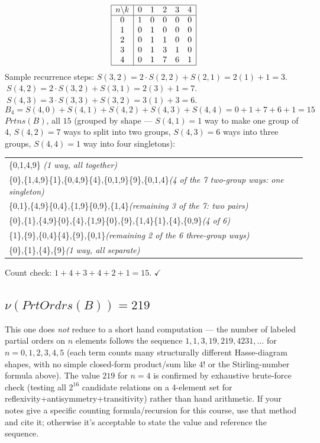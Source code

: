 \documentclass[11pt]{article}
\newcommand{\op}[1]{\mathit{#1}}
\newcommand{\Prtns}{\op{Prtns}}
\begin{document}
\[
\begin{array}{|c|ccccc|}
\hline
n\backslash k & 0 & 1 & 2 & 3 & 4\\\hline
0 & 1 & 0 & 0 & 0 & 0\\
1 & 0 & 1 & 0 & 0 & 0\\
2 & 0 & 1 & 1 & 0 & 0\\
3 & 0 & 1 & 3 & 1 & 0\\
4 & 0 & 1 & 7 & 6 & 1\\\hline
\end{array}
\]
Sample recurrence steps: $S(3,2)=2\cdot S(2,2)+S(2,1)=2(1)+1=3$. $\ S(4,2)=2\cdot S(3,2)+S(3,1)=2(3)+1=7$. $\ S(4,3)=3\cdot S(3,3)+S(3,2)=3(1)+3=6$.
\[
B_4 = S(4,0)+S(4,1)+S(4,2)+S(4,3)+S(4,4) = 0+1+7+6+1 = 15
\]
$\Prtns(B)$, all $15$ (grouped by shape --- $S(4,1)=1$ way to make one group of 4, $S(4,2)=7$ ways to split into two groups, $S(4,3)=6$ ways into three groups, $S(4,4)=1$ way into four singletons):
\begin{center}
\begin{tabular}{l}
\{0,1,4,9\} \hfill\textit{(1 way, all together)}\\[2mm]
\{0\},\{1,4,9\}\quad \{1\},\{0,4,9\}\quad \{4\},\{0,1,9\}\quad \{9\},\{0,1,4\}\hfill\textit{(4 of the 7 two-group ways: one singleton)}\\
\{0,1\},\{4,9\}\quad \{0,4\},\{1,9\}\quad \{0,9\},\{1,4\}\hfill\textit{(remaining 3 of the 7: two pairs)}\\[2mm]
\{0\},\{1\},\{4,9\}\quad \{0\},\{4\},\{1,9\}\quad \{0\},\{9\},\{1,4\}\quad \{1\},\{4\},\{0,9\}\hfill\textit{(4 of 6)}\\
\{1\},\{9\},\{0,4\}\quad \{4\},\{9\},\{0,1\}\hfill\textit{(remaining 2 of the 6 three-group ways)}\\[2mm]
\{0\},\{1\},\{4\},\{9\}\hfill\textit{(1 way, all separate)}
\end{tabular}
\end{center}
Count check: $1+4+3+4+2+1 = 15$. $\checkmark$

\subsection*{$\nu(\op{PrtOrdrs}(B)) = 219$}
This one does \emph{not} reduce to a short hand computation --- the number of labeled partial orders on $n$ elements follows the sequence $1,1,3,19,219,4231,\dots$ for $n=0,1,2,3,4,5$ (each term counts many structurally different Hasse-diagram shapes, with no simple closed-form product/sum like $4!$ or the Stirling-number formula above). The value $219$ for $n=4$ is confirmed by exhaustive brute-force check (testing all $2^{16}$ candidate relations on a 4-element set for reflexivity+antisymmetry+transitivity) rather than hand arithmetic. If your notes give a specific counting formula/recursion for this course, use that method and cite it; otherwise it's acceptable to state the value and reference the sequence.
\end{document}
